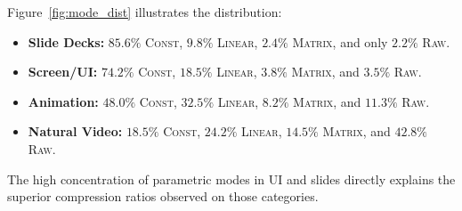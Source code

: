 Figure~\ref{fig:mode_dist} illustrates the distribution:
\begin{itemize}
    \item \textbf{Slide Decks:} $85.6\%$ \textsc{Const}, $9.8\%$ \textsc{Linear}, $2.4\%$ \textsc{Matrix}, and only $2.2\%$ \textsc{Raw}.
    \item \textbf{Screen/UI:} $74.2\%$ \textsc{Const}, $18.5\%$ \textsc{Linear}, $3.8\%$ \textsc{Matrix}, and $3.5\%$ \textsc{Raw}.
    \item \textbf{Animation:} $48.0\%$ \textsc{Const}, $32.5\%$ \textsc{Linear}, $8.2\%$ \textsc{Matrix}, and $11.3\%$ \textsc{Raw}.
    \item \textbf{Natural Video:} $18.5\%$ \textsc{Const}, $24.2\%$ \textsc{Linear}, $14.5\%$ \textsc{Matrix}, and $42.8\%$ \textsc{Raw}.
\end{itemize}
The high concentration of parametric modes in UI and slides directly explains the superior compression ratios observed on those categories.
